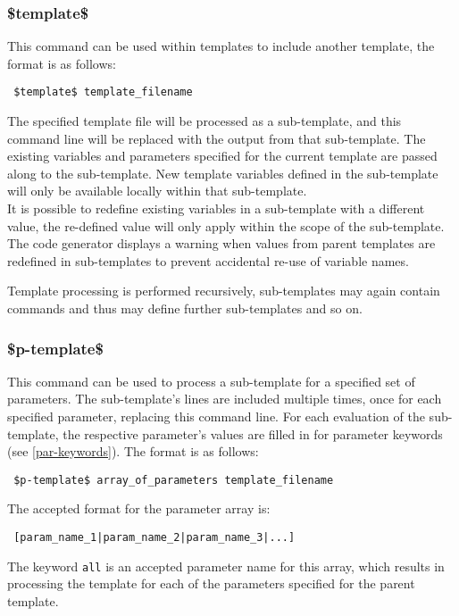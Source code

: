 \documentclass{settings/TU_Delft_Report}
\begin{document}
\subsubsection{\$template\$}
This command can be used within templates to include another template, the format is as follows:
\begin{lstlisting}
 $template$ template_filename
\end{lstlisting}

The specified template file will be processed as a sub-template, and this command line will be replaced with the output from that sub-template. The existing variables and parameters specified for the current template are passed along to the sub-template. New template variables defined in the sub-template will only be available locally within that sub-template.\\

It is possible to redefine existing variables in a sub-template with a different value, the re-defined value will only apply within the scope of the sub-template. The code generator displays a warning when values from parent templates are redefined in sub-templates to prevent accidental re-use of variable names.

Template processing is performed recursively, sub-templates may again contain commands and thus may define further sub-templates and so on.

\subsubsection{\$p-template\$} \label{p-template}
This command can be used to process a sub-template for a specified set of parameters. The sub-template's lines are included multiple times, once for each specified parameter, replacing this command line. For each evaluation of the sub-template, the respective parameter's values are filled in for parameter keywords (see \ref{par-keywords}). The format is as follows:
\begin{lstlisting}
 $p-template$ array_of_parameters template_filename
\end{lstlisting}
The accepted format for the parameter array is:
\begin{lstlisting}
 [param_name_1|param_name_2|param_name_3|...]
\end{lstlisting}
The keyword \lstinline{all} is an accepted parameter name for this array, which results in processing the template for each of the parameters specified for the parent template.
\end{document}

